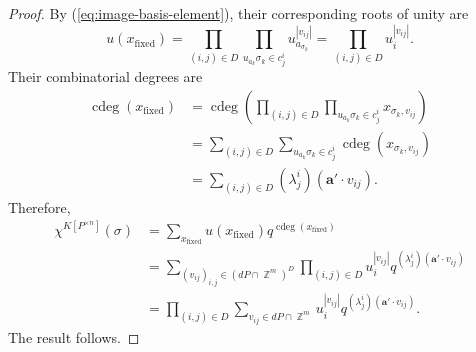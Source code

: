 \documentclass[10pt,a4paper]{amsart}
\DeclareMathOperator{\ZZ}{\mathbb{Z}}
\DeclareMathOperator{\cdeg}{cdeg}
\DeclareMathOperator{\fixed}{fixed}
\begin{document}
\begin{proof}
    By (\ref{eq:image-basis-element}), their corresponding roots of unity are
    \[
    u(x_{\fixed}) = \prod_{(i, j) \in D}\prod_{u_{a_k}\sigma_k \in c_j^i} u_{a_{\sigma_k}}^{|v_{ij}|} = \prod_{(i, j) \in D} u_i^{|v_{ij}|}.
    \]
    Their combinatorial degrees are
    \begin{align*}
        \cdeg(x_{\fixed}) 
        &= \cdeg \left ( \prod_{(i, j) \in D}\prod_{u_{a_k}\sigma_k \in c_j^i} x_{\sigma_{k}, v_{ij}} \right ) \\
        &= \sum_{(i, j) \in D} \sum_{u_{a_k}\sigma_k \in c_j^i} \cdeg(x_{\sigma_{k}, v_{ij}}) \\
        &= \sum_{(i, j) \in D} (\lambda_j^i) (\bm{a}' \cdot v_{ij}).
    \end{align*}
    Therefore,
    \begin{align*}
        [t^d]\chi^{K[P^{\times n}]}(\sigma) 
        &= \sum_{x_{\fixed}} u(x_{\fixed})q^{\cdeg(x_{\fixed})} \\
        &= \sum_{(v_{ij})_{i, j} \in (dP \cap \ZZ^m)^D} \prod_{(i, j) \in D} u_i^{|v_{ij}|}q^{(\lambda_j^i) (\bm{a}' \cdot v_{ij})} \\
        &= \prod_{(i, j) \in D} \sum_{v_{ij} \in dP \cap \ZZ^m} u_i^{|v_{ij}|}q^{(\lambda_j^i) (\bm{a}' \cdot v_{ij})}.
    \end{align*}
    The result follows.
\end{proof}
\end{document}
